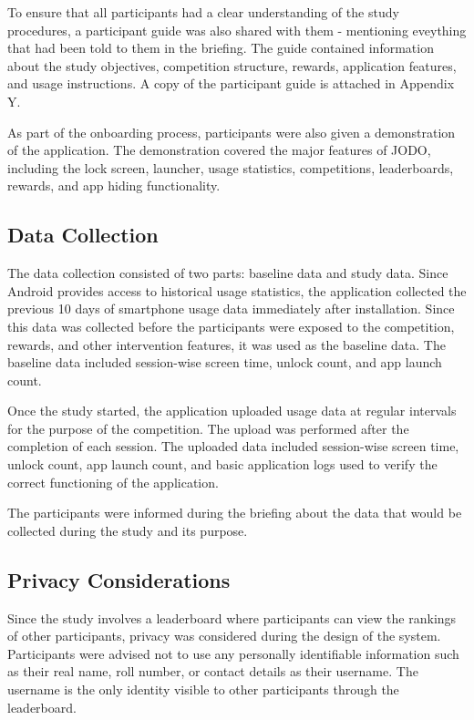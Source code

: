 \documentclass[11pt]{report}
\begin{document}
To ensure that all participants had a clear understanding of the study procedures, a participant guide was also shared with them - mentioning eveything that had been told to them in the briefing. 
The guide contained information about the study objectives, competition structure, rewards, application features, and usage instructions. A copy of the participant guide is attached in Appendix Y.

As part of the onboarding process, participants were also given a demonstration of the application. 
The demonstration covered the major features of JODO, including the lock screen, launcher, usage statistics, competitions, leaderboards, rewards, and app hiding functionality. 

\subsection{Data Collection}

The data collection consisted of two parts: baseline data and study data. 
Since Android provides access to historical usage statistics, the application collected the previous 10 days of smartphone usage data immediately after installation. 
Since this data was collected before the participants were exposed to the competition, rewards, and other intervention features, it was used as the baseline data. 
The baseline data included session-wise screen time, unlock count, and app launch count.

Once the study started, the application uploaded usage data at regular intervals for the purpose of the competition. 
The upload was performed after the completion of each session. 
The uploaded data included session-wise screen time, unlock count, app launch count, and basic application logs used to verify the correct functioning of the application.

The participants were informed during the briefing about the data that would be collected during the study and its purpose.

\subsection{Privacy Considerations}

Since the study involves a leaderboard where participants can view the rankings of other participants, privacy was considered during the design of the system. 
Participants were advised not to use any personally identifiable information such as their real name, roll number, or contact details as their username. 
The username is the only identity visible to other participants through the leaderboard.
\end{document}
